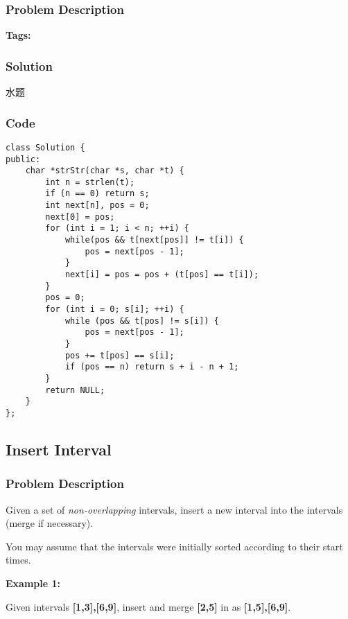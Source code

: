 \documentclass{article}
\begin{document}
\begin{CJK*}{UTF8}{gkai}
\subsubsection*{Problem Description}

\textbf{Tags: }



\subsubsection*{Solution}
水题

\subsubsection*{Code}
\begin{lstlisting}
class Solution {
public:
    char *strStr(char *s, char *t) {
        int n = strlen(t);
        if (n == 0) return s;
        int next[n], pos = 0;
        next[0] = pos;
        for (int i = 1; i < n; ++i) {
            while(pos && t[next[pos]] != t[i]) {
                pos = next[pos - 1];
            }
            next[i] = pos = pos + (t[pos] == t[i]);
        }
        pos = 0;
        for (int i = 0; s[i]; ++i) {
            while (pos && t[pos] != s[i]) {
                pos = next[pos - 1];
            }
            pos += t[pos] == s[i];
            if (pos == n) return s + i - n + 1;
        }
        return NULL;
    }
};

\end{lstlisting}


\subsection{ Insert Interval }
\label{ Insert Interval }

\subsubsection*{Problem Description}
Given a set of \emph{non-overlapping} intervals, insert a new interval into the intervals (merge if necessary).

You may assume that the intervals were initially sorted according to their start times.

\textbf{Example 1:}


Given intervals \textbf{[1,3],[6,9]}, insert and merge \textbf{[2,5]} in as \textbf{[1,5],[6,9]}.


\end{CJK*}
\end{document}
